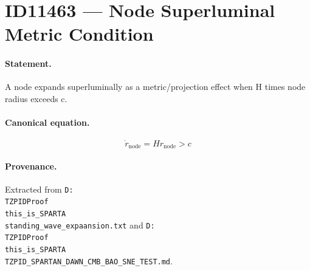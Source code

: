 \section*{ID11463 --- Node Superluminal Metric Condition}

\paragraph{Statement.}
A node expands superluminally as a metric/projection effect when H times node radius exceeds c.

\paragraph{Canonical equation.}
\[
\dot r_{\mathrm{node}}=H r_{\mathrm{node}}>c
\]

\paragraph{Provenance.}
Extracted from \texttt{D:\\TZPIDProof\\this\_is\_SPARTA\\standing\_wave\_expaansion.txt} and \texttt{D:\\TZPIDProof\\this\_is\_SPARTA\\TZPID\_SPARTAN\_DAWN\_CMB\_BAO\_SNE\_TEST.md}.
